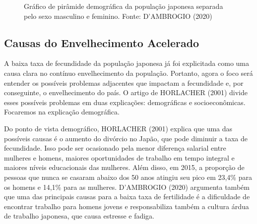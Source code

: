 \documentclass[
  12pt,
  letterpaper,
  DIV=11,
  numbers=noendperiod]{scrartcl}
\begin{document}
\begin{figure}


\caption{\label{fig-pir}Gráfico de pirâmide demográfica da população
japonesa separada pelo sexo masculino e feminino. Fonte: D'AMBROGIO
(2020)}

\end{figure}%

\subsection{Causas do Envelhecimento
Acelerado}\label{causas-do-envelhecimento-acelerado}

A baixa taxa de fecundidade da população japonesa já foi explicitada
como uma causa clara no contínuo envelhecimento da população. Portanto,
agora o foco será entender os possíveis problemas adjacentes que
impactam a fecundidade e, por conseguinte, o envelhecimento do país. O
artigo de HORLACHER (2001) divide esses possíveis problemas em duas
explicações: demográficas e socioeconômicas. Focaremos na explicação
demográfica.

\vspace{12pt}

Do ponto de vista demográfico, HORLACHER (2001) explica que uma das
possíveis causas é o aumento do divórcio no Japão, que pode diminuir a
taxa de fecundidade. Isso pode ser ocasionado pela menor diferença
salarial entre mulheres e homens, maiores oportunidades de trabalho em
tempo integral e maiores níveis educacionais das mulheres. Além disso,
em 2015, a proporção de pessoas que nunca se casaram abaixo dos 50 anos
atingiu seu pico em 23,4\% para os homens e 14,1\% para as mulheres.
D'AMBROGIO (2020) argumenta também que uma das principais causas para a
baixa taxa de fertilidade é a dificuldade de encontrar trabalho para
homens jovens e responsabiliza também a cultura árdua de trabalho
japonesa, que causa estresse e fadiga.
\end{document}
